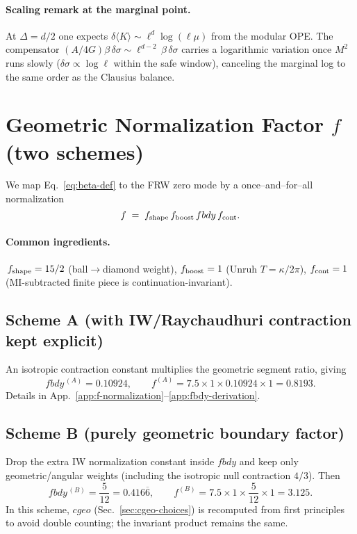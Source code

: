 \documentclass[aps,prd,onecolumn,superscriptaddress,nofootinbib]{revtex4-2}
\def\cgeo{cgeo}%
\def\fbdy{fbdy}%
\newcommand{\cgeo}{c_{\rm geo}}
\newcommand{\fbdy}{f_{\rm bdy}}
\begin{document}
\paragraph*{Scaling remark at the marginal point.}
At \(\Delta=d/2\) one expects \(\delta\!\langle K\rangle\sim \ell^{d}\log(\ell\mu)\) from the modular OPE. The compensator \((A/4G)\beta\,\delta\sigma\sim \ell^{d-2}\,\beta\,\delta\sigma\) carries a logarithmic variation once \(M^2\) runs slowly (\(\delta\sigma\propto \log \ell\) within the safe window), canceling the marginal log to the same order as the Clausius balance.

\section{Geometric Normalization Factor \texorpdfstring{$f$}{f} (two schemes)}
\label{sec:f-norm}
We map Eq.~\eqref{eq:beta-def} to the FRW zero mode by a once–and–for–all normalization
\begin{equation}
f \;=\; f_{\rm shape}\, f_{\rm boost}\, \fbdy\, f_{\rm cont}.
\end{equation}

\paragraph*{Common ingredients.}
\(\,f_{\rm shape}=15/2\) (ball\(\to\)diamond weight), \(f_{\rm boost}=1\) (Unruh \(T=\kappa/2\pi\)), \(f_{\rm cont}=1\) (MI-subtracted finite piece is continuation-invariant).

\subsection{Scheme A (with IW/Raychaudhuri contraction kept explicit)}
An isotropic contraction constant multiplies the geometric segment ratio, giving
\[
\fbdy^{\,(A)}=0.10924,\qquad
f^{(A)}=7.5\times 1 \times 0.10924 \times 1=0.8193.
\]
Details in App.~\ref{app:f-normalization}--\ref{app:fbdy-derivation}.

\subsection{Scheme B (purely geometric boundary factor)}
Drop the extra IW normalization constant inside \(\fbdy\) and keep only geometric/angular weights (including the isotropic null contraction \(4/3\)). Then
\[
\fbdy^{\,(B)}=\frac{5}{12}=0.416\overline{6},\qquad
f^{(B)}=7.5\times 1 \times \frac{5}{12}\times 1=3.125.
\]
In this scheme, \(\cgeo\) (Sec.~\ref{sec:cgeo-choices}) is recomputed from first principles to avoid double counting; the invariant product remains the same.
\end{document}
